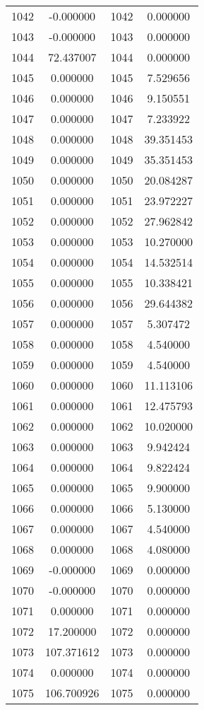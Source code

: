 \documentclass[12pt]{article}
\begin{document}
\begin{longtable}{@{}cccc@{}}
1042 & -0.000000 & 1042 & 0.000000 \\
1043 & -0.000000 & 1043 & 0.000000 \\
1044 & 72.437007 & 1044 & 0.000000 \\
1045 & 0.000000 & 1045 & 7.529656 \\
1046 & 0.000000 & 1046 & 9.150551 \\
1047 & 0.000000 & 1047 & 7.233922 \\
1048 & 0.000000 & 1048 & 39.351453 \\
1049 & 0.000000 & 1049 & 35.351453 \\
1050 & 0.000000 & 1050 & 20.084287 \\
1051 & 0.000000 & 1051 & 23.972227 \\
1052 & 0.000000 & 1052 & 27.962842 \\
1053 & 0.000000 & 1053 & 10.270000 \\
1054 & 0.000000 & 1054 & 14.532514 \\
1055 & 0.000000 & 1055 & 10.338421 \\
1056 & 0.000000 & 1056 & 29.644382 \\
1057 & 0.000000 & 1057 & 5.307472 \\
1058 & 0.000000 & 1058 & 4.540000 \\
1059 & 0.000000 & 1059 & 4.540000 \\
1060 & 0.000000 & 1060 & 11.113106 \\
1061 & 0.000000 & 1061 & 12.475793 \\
1062 & 0.000000 & 1062 & 10.020000 \\
1063 & 0.000000 & 1063 & 9.942424 \\
1064 & 0.000000 & 1064 & 9.822424 \\
1065 & 0.000000 & 1065 & 9.900000 \\
1066 & 0.000000 & 1066 & 5.130000 \\
1067 & 0.000000 & 1067 & 4.540000 \\
1068 & 0.000000 & 1068 & 4.080000 \\
1069 & -0.000000 & 1069 & 0.000000 \\
1070 & -0.000000 & 1070 & 0.000000 \\
1071 & 0.000000 & 1071 & 0.000000 \\
1072 & 17.200000 & 1072 & 0.000000 \\
1073 & 107.371612 & 1073 & 0.000000 \\
1074 & 0.000000 & 1074 & 0.000000 \\
1075 & 106.700926 & 1075 & 0.000000 \\

\end{longtable}
\end{document}
